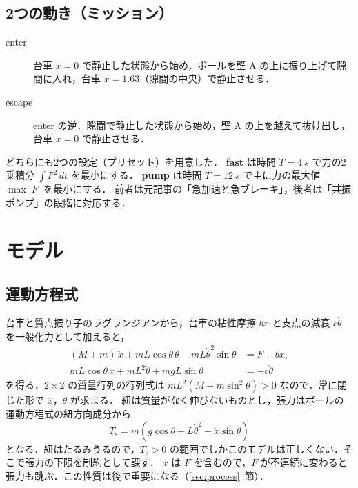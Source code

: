 \documentclass[a4paper,10pt]{ltjsarticle}
\newcommand{\secref}[1]{\ref{#1}~節}
\begin{document}
\subsection{2つの動き（ミッション）}

\begin{description}
  \item[enter] 台車 $x=0$ で静止した状態から始め，ボールを壁 A の上に振り上げて隙間に入れ，台車 $x=1.63$（隙間の中央）で静止させる．
  \item[escape] enter の逆．隙間で静止した状態から始め，壁 A の上を越えて抜け出し，台車 $x=0$ で静止させる．
\end{description}

どちらにも2つの設定（プリセット）を用意した．
\textbf{fast} は時間 $T=\SI{4}{s}$ で力の2乗積分 $\int F^2\,dt$ を最小にする．
\textbf{pump} は時間 $T=\SI{12}{s}$ で主に力の最大値 $\max|F|$ を最小にする．
前者は元記事の「急加速と急ブレーキ」，後者は「共振ポンプ」の段階に対応する．

\section{モデル}

\subsection{運動方程式}

台車と質点振り子のラグランジアンから，台車の粘性摩擦 $b\dot x$ と支点の減衰 $c\dot\theta$ を一般化力として加えると，
\begin{align}
  (M+m)\,\ddot x + mL\cos\theta\,\ddot\theta - mL\dot\theta^2\sin\theta &= F - b\dot x, \label{eq:eom1}\\
  mL\cos\theta\,\ddot x + mL^2\ddot\theta + mgL\sin\theta &= -c\dot\theta \label{eq:eom2}
\end{align}
を得る．$2\times 2$ の質量行列の行列式は $mL^2(M + m\sin^2\theta) > 0$ なので，常に閉じた形で $\ddot x$，$\ddot\theta$ が求まる．
紐は質量がなく伸びないものとし，張力はボールの運動方程式の紐方向成分から
\begin{equation}
  T_{\mathrm s} = m\left(g\cos\theta + L\dot\theta^2 - \ddot x\sin\theta\right) \label{eq:tension}
\end{equation}
となる．紐はたるみうるので，$T_{\mathrm s} > 0$ の範囲でしかこのモデルは正しくない．そこで張力の下限を制約として課す．
$\ddot x$ は $F$ を含むので，$F$ が不連続に変わると張力も跳ぶ．この性質は後で重要になる（\secref{sec:process}）．
\end{document}
